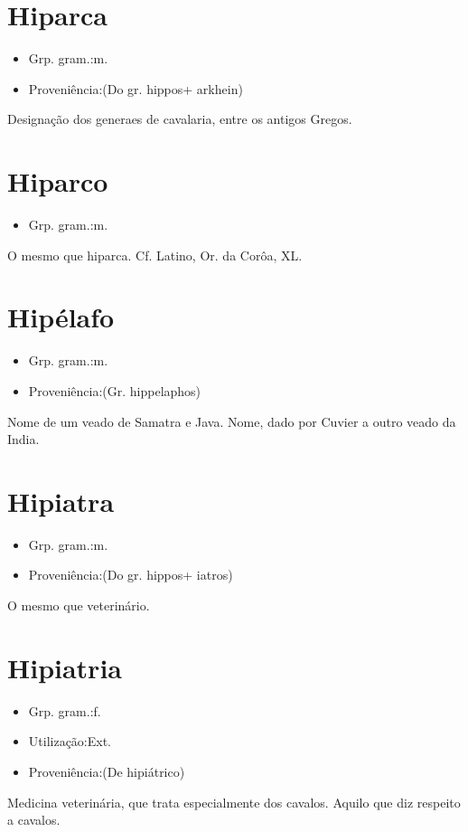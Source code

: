 \documentclass{article}
\begin{document}
\section{Hiparca}
\begin{itemize}
\item {Grp. gram.:m.}
\end{itemize}
\begin{itemize}
\item {Proveniência:(Do gr. \textunderscore hippos\textunderscore  + \textunderscore arkhein\textunderscore )}
\end{itemize}
Designação dos generaes de cavalaria, entre os antigos Gregos.
\section{Hiparco}
\begin{itemize}
\item {Grp. gram.:m.}
\end{itemize}
O mesmo que \textunderscore hiparca\textunderscore . Cf. Latino, \textunderscore Or. da Corôa\textunderscore , XL.
\section{Hipélafo}
\begin{itemize}
\item {Grp. gram.:m.}
\end{itemize}
\begin{itemize}
\item {Proveniência:(Gr. \textunderscore hippelaphos\textunderscore )}
\end{itemize}
Nome de um veado de Samatra e Java.
Nome, dado por Cuvier a outro veado da India.
\section{Hipiatra}
\begin{itemize}
\item {Grp. gram.:m.}
\end{itemize}
\begin{itemize}
\item {Proveniência:(Do gr. \textunderscore hippos\textunderscore  + \textunderscore iatros\textunderscore )}
\end{itemize}
O mesmo que \textunderscore veterinário\textunderscore .
\section{Hipiatria}
\begin{itemize}
\item {Grp. gram.:f.}
\end{itemize}
\begin{itemize}
\item {Utilização:Ext.}
\end{itemize}
\begin{itemize}
\item {Proveniência:(De \textunderscore hipiátrico\textunderscore )}
\end{itemize}
Medicina veterinária, que trata especialmente dos cavalos.
Aquilo que diz respeito a cavalos.
\end{document}
